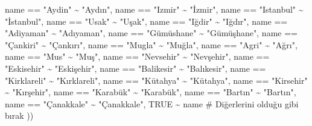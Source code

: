 \documentclass[
  11pt,
  a4paper,
  DIV=11,
  numbers=noendperiod]{scrartcl}
\newenvironment{Shaded}{\begin{snugshade}}{\end{snugshade}}
\newcommand{\CommentTok}[1]{\textcolor[rgb]{0.37,0.37,0.37}{#1}}
\newcommand{\ConstantTok}[1]{\textcolor[rgb]{0.56,0.35,0.01}{#1}}
\newcommand{\NormalTok}[1]{\textcolor[rgb]{0.00,0.23,0.31}{#1}}
\newcommand{\SpecialCharTok}[1]{\textcolor[rgb]{0.37,0.37,0.37}{#1}}
\newcommand{\StringTok}[1]{\textcolor[rgb]{0.13,0.47,0.30}{#1}}
\begin{document}
\begin{Shaded}
\begin{Highlighting}[]
\NormalTok{    name }\SpecialCharTok{==} \StringTok{"Aydin"}          \SpecialCharTok{\textasciitilde{}} \StringTok{"Aydın"}\NormalTok{,}
\NormalTok{    name }\SpecialCharTok{==} \StringTok{"Izmir"}          \SpecialCharTok{\textasciitilde{}} \StringTok{"İzmir"}\NormalTok{,}
\NormalTok{    name }\SpecialCharTok{==} \StringTok{"Istanbul"}       \SpecialCharTok{\textasciitilde{}} \StringTok{"İstanbul"}\NormalTok{,}
\NormalTok{    name }\SpecialCharTok{==} \StringTok{"Usak"}           \SpecialCharTok{\textasciitilde{}} \StringTok{"Uşak"}\NormalTok{,}
\NormalTok{    name }\SpecialCharTok{==} \StringTok{"Iğdir"}          \SpecialCharTok{\textasciitilde{}} \StringTok{"Iğdır"}\NormalTok{,}
\NormalTok{    name }\SpecialCharTok{==} \StringTok{"Adiyaman"}       \SpecialCharTok{\textasciitilde{}} \StringTok{"Adıyaman"}\NormalTok{,}
\NormalTok{    name }\SpecialCharTok{==} \StringTok{"Gümüshane"}      \SpecialCharTok{\textasciitilde{}} \StringTok{"Gümüşhane"}\NormalTok{,}
\NormalTok{    name }\SpecialCharTok{==} \StringTok{"Çankiri"}        \SpecialCharTok{\textasciitilde{}} \StringTok{"Çankırı"}\NormalTok{,}
\NormalTok{    name }\SpecialCharTok{==} \StringTok{"Mugla"}          \SpecialCharTok{\textasciitilde{}} \StringTok{"Muğla"}\NormalTok{,}
\NormalTok{    name }\SpecialCharTok{==} \StringTok{"Agri"}           \SpecialCharTok{\textasciitilde{}} \StringTok{"Ağrı"}\NormalTok{,}
\NormalTok{    name }\SpecialCharTok{==} \StringTok{"Mus"}            \SpecialCharTok{\textasciitilde{}} \StringTok{"Muş"}\NormalTok{,}
\NormalTok{    name }\SpecialCharTok{==} \StringTok{"Nevsehir"}       \SpecialCharTok{\textasciitilde{}} \StringTok{"Nevşehir"}\NormalTok{,}
\NormalTok{    name }\SpecialCharTok{==} \StringTok{"Eskisehir"}      \SpecialCharTok{\textasciitilde{}} \StringTok{"Eskişehir"}\NormalTok{,}
\NormalTok{    name }\SpecialCharTok{==} \StringTok{"Balikesir"}      \SpecialCharTok{\textasciitilde{}} \StringTok{"Balıkesir"}\NormalTok{,}
\NormalTok{    name }\SpecialCharTok{==} \StringTok{"Kirklareli"}     \SpecialCharTok{\textasciitilde{}} \StringTok{"Kırklareli"}\NormalTok{,}
\NormalTok{    name }\SpecialCharTok{==} \StringTok{"Kütahya"}        \SpecialCharTok{\textasciitilde{}} \StringTok{"Kütahya"}\NormalTok{,}
\NormalTok{    name }\SpecialCharTok{==} \StringTok{"Kirsehir"}       \SpecialCharTok{\textasciitilde{}} \StringTok{"Kırşehir"}\NormalTok{,}
\NormalTok{    name }\SpecialCharTok{==} \StringTok{"Karabük"}        \SpecialCharTok{\textasciitilde{}} \StringTok{"Karabük"}\NormalTok{,}
\NormalTok{    name }\SpecialCharTok{==} \StringTok{"Bartın"}         \SpecialCharTok{\textasciitilde{}} \StringTok{"Bartın"}\NormalTok{,}
\NormalTok{    name }\SpecialCharTok{==} \StringTok{"Çanakkale"}      \SpecialCharTok{\textasciitilde{}} \StringTok{"Çanakkale"}\NormalTok{,}
    \ConstantTok{TRUE}                     \SpecialCharTok{\textasciitilde{}}\NormalTok{ name }\CommentTok{\# Diğerlerini olduğu gibi bırak}
\NormalTok{  ))}
\end{Highlighting}
\end{Shaded}
\end{document}
